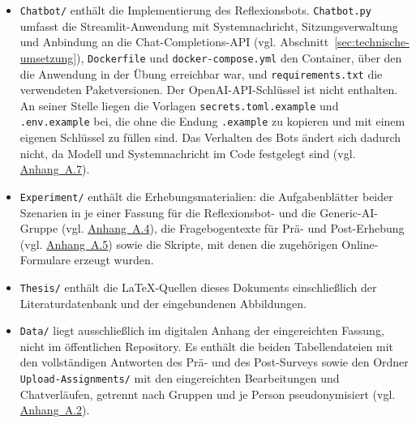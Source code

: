 \begin{itemize}
    \item \texttt{Chatbot/} enthält die Implementierung des Reflexionsbots. \texttt{Chatbot.py}
    umfasst die Streamlit-Anwendung mit Systemnachricht, Sitzungsverwaltung und Anbindung an die
    Chat-Completions-API (vgl. Abschnitt~\ref{sec:technische-umsetzung}), \texttt{Dockerfile} und
    \texttt{docker-compose.yml} den Container, über den die Anwendung in der Übung erreichbar war,
    und \texttt{requirements.txt} die verwendeten Paketversionen. Der OpenAI-API-Schlüssel ist nicht
    enthalten. An seiner Stelle liegen die Vorlagen \texttt{secrets.toml.example} und
    \texttt{.env.example} bei, die ohne die Endung \texttt{.example} zu kopieren und mit einem
    eigenen Schlüssel zu füllen sind. Das Verhalten des Bots ändert sich dadurch nicht, da Modell
    und Systemnachricht im Code festgelegt sind (vgl. \hyperref[app:systemprompt]{Anhang~A.7}).

    \item \texttt{Experiment/} enthält die Erhebungsmaterialien: die Aufgabenblätter beider
    Szenarien in je einer Fassung für die Reflexionsbot- und die Generic-AI-Gruppe (vgl.
    \hyperref[app:szenarien]{Anhang~A.4}), die Fragebogentexte für Prä- und Post-Erhebung
    (vgl. \hyperref[app:fragebogen]{Anhang~A.5}) sowie die Skripte, mit denen die zugehörigen
    Online-Formulare erzeugt wurden.

    \item \texttt{Thesis/} enthält die \LaTeX-Quellen dieses Dokuments einschließlich der
    Literaturdatenbank und der eingebundenen Abbildungen.

    \item \texttt{Data/} liegt ausschließlich im digitalen Anhang der eingereichten Fassung, nicht
    im öffentlichen Repository. Es enthält die beiden Tabellendateien mit den vollständigen
    Antworten des Prä- und des Post-Surveys sowie den Ordner \texttt{Upload-Assignments/} mit den
    eingereichten Bearbeitungen und Chatverläufen, getrennt nach Gruppen und je Person
    pseudonymisiert (vgl. \hyperref[app:kodierungstabelle]{Anhang~A.2}).
\end{itemize}

